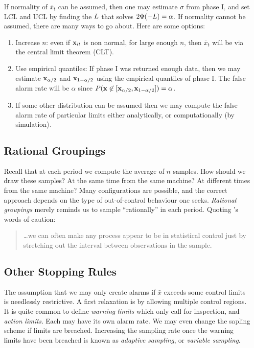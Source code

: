 If normality of $\bar{x}_t$ can be assumed, then one may estimate $\sigma$ from phase I, and set LCL and UCL by finding the $L$ that solves $2\Phi(-L)=\alpha$.
If normality cannot be assumed, there are many ways to go about. Here are some options:
\begin{enumerate}
\item Increase $n$: even if $\mathbf{x}_{it}$ is non normal, for large enough $n$, then $\bar{x}_t$ will be via the central limit theorem (CLT).
\item Use empirical quantiles: If phase I was returned enough data, then we may estimate $\mathbf{x}_{\alpha/2}$ and $\mathbf{x}_{1-\alpha/2}$ using the empirical quantiles of phase I. The false alarm rate will be $\alpha$ since $P(\mathbf{x} \not \in [\mathbf{x}_{\alpha/2},\mathbf{x}_{1-\alpha/2}])=\alpha$.
\item If some other distribution can be assumed then we may compute the false alarm rate of particular limits either analytically, or computationally (by simulation).
\end{enumerate}




\subsection{Rational Groupings}
\label{sec:rational_grouping}
Recall that at each period we compute the average of $n$ samples. 
How should we draw these samples? 
At the same time from the same machine?
At different times from the same machine?
Many configurations are possible, and the correct approach depends on the type of out-of-control behaviour one seeks. 
\emph{Rational groupings} merely reminds us to sample ``rationally'' in each period. 
Quoting \cite{montgomery_introduction_2007}'s words of caution:
\begin{quotation}
\dots we can often make any process appear to be in statistical control just by stretching out the interval between observations in the sample.
\end{quotation}






\subsection{Other Stopping Rules}
\label{sec:stopping_rules}

The assumption that we may only create alarms if $\bar{x}$ exceeds some control limits is needlessly restrictive.
A first relaxation is by allowing multiple control regions.
It is quite common to define \emph{warning limits} which only call for inspection, and \emph{action limits}. Each may have its own alarm rate.
We may even change the sapling scheme if limits are breached. Increasing the sampling rate once the warning limits have been breached is known as \emph{adaptive sampling}, or \emph{variable sampling}.



